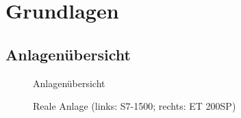 \section{Grundlagen} \label{sec:Grundlagen}

\subsection{Anlagenübersicht}
\begin{figure}[H]
   \centering
   \caption[Anlagenübersicht]{Anlagenübersicht}
   \label{fig:Bild1.1}
\end{figure}

\begin{figure}[H]
   \centering
   \caption[Reale Anlage]{Reale Anlage (links: S7-1500; rechts: ET 200SP)}
   \label{fig:Bild1.2}
\end{figure}

